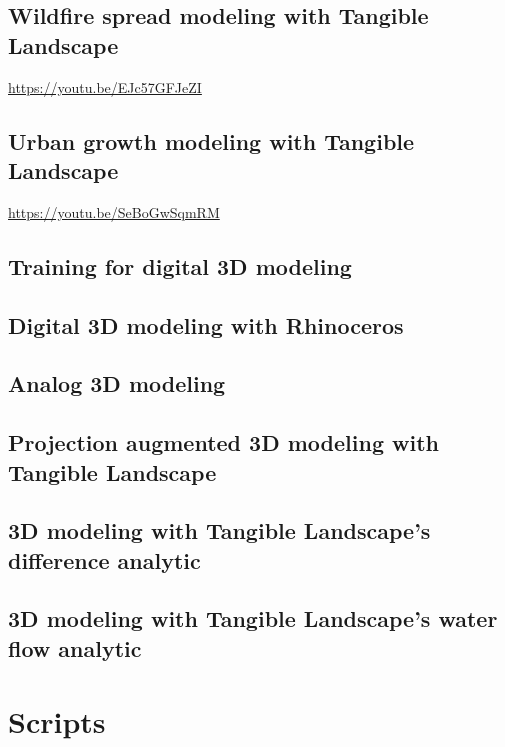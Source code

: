 \documentclass[prodmode,acmtochi]{acmsmall} %
\begin{document}
\subsection{Wildfire spread modeling with Tangible Landscape}\label{videos:fire}
\url{https://youtu.be/EJc57GFJeZI}

\subsection{Urban growth modeling with Tangible Landscape}\label{videos:urban}
\url{https://youtu.be/SeBoGwSqmRM}

\subsection{Training for digital 3D modeling}\label{videos:training}

\subsection{Digital 3D modeling with Rhinoceros}\label{videos:digital}

\subsection{Analog 3D modeling}\label{videos:analog}

\subsection{Projection augmented 3D modeling with Tangible Landscape}\label{videos:augmented}

\subsection{3D modeling with Tangible Landscape's difference analytic}\label{videos:difference}

\subsection{3D modeling with Tangible Landscape's water flow analytic}\label{videos:water}

\vfill

\clearpage

\section{Scripts}\label{appendix:scripts}
\end{document}

